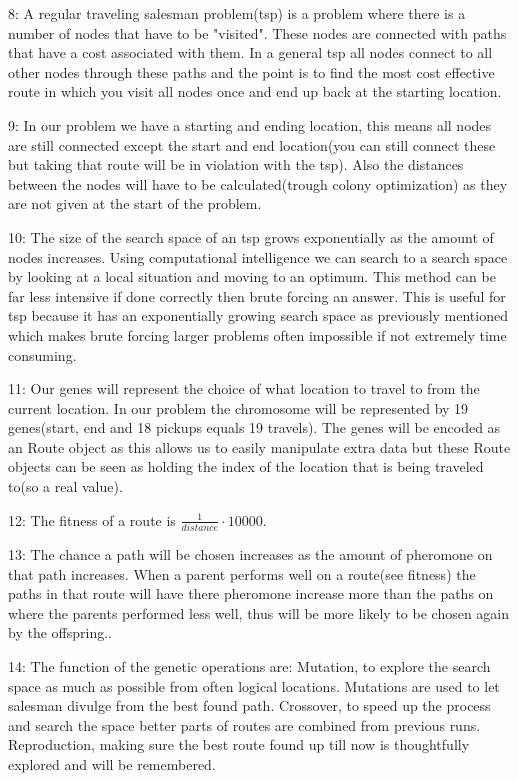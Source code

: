 \documentclass{article}
\begin{document}
8: A regular traveling salesman problem(tsp) is a problem where there is a number of nodes that have to be "visited". These nodes are connected with paths that have a cost associated with them. In a general tsp all nodes connect to all other nodes through these paths and the point is to find the most cost effective route in which you visit all nodes once and end up back at the starting location.

9: In our problem we have a starting and ending location, this means all nodes are still connected except the start and end location(you can still connect these but taking that route will be in violation with the tsp). Also the distances between the nodes will have to be calculated(trough colony optimization) as they are not given at the start of the problem.

10: The size of the search space of an tsp grows exponentially as the amount of nodes increases. Using computational intelligence  we can search to a search space by looking at a local situation and moving to an optimum. This method can be far less intensive if done correctly then brute forcing an answer. This is useful for tsp because it has an exponentially growing search space as previously mentioned which makes brute forcing larger problems often impossible if not extremely time consuming.

11: Our genes will represent the choice of what location to travel to from the current location. In our problem the chromosome will be represented by 19 genes(start, end and 18 pickups equals 19 travels). The genes will be encoded as an Route object as this allows us to easily manipulate extra data but these Route objects can be seen as holding the index of the location that is being traveled to(so a real value).

12: The fitness of a route is $\frac{1}{distance} \cdot 10000$.

13: The chance a path will be chosen increases as the amount of pheromone on that path increases. When a parent performs well on a route(see fitness) the paths in that route will have there pheromone increase more than the paths on where the parents performed less well, thus will be more likely to be chosen again by the offspring..

14: The function of the genetic operations are: Mutation, to explore the search space as much as possible from often logical locations. Mutations are used to let salesman divulge from the best found path. Crossover, to speed up the process and search the space better parts of routes are combined from previous runs.  Reproduction, making sure the best route found up till now is thoughtfully explored and will be remembered.
\end{document}
